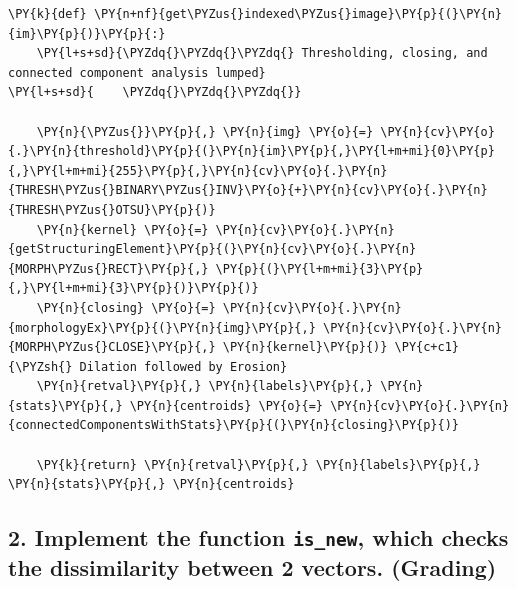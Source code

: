 \documentclass[a4paper,11pt]{article}%
\begin{document}
    \begin{tcolorbox}[breakable, size=fbox, boxrule=1pt, pad at break*=1mm,colback=cellbackground, colframe=cellborder]
\begin{Verbatim}[commandchars=\\\{\}]
\PY{k}{def} \PY{n+nf}{get\PYZus{}indexed\PYZus{}image}\PY{p}{(}\PY{n}{im}\PY{p}{)}\PY{p}{:}
    \PY{l+s+sd}{\PYZdq{}\PYZdq{}\PYZdq{} Thresholding, closing, and connected component analysis lumped}
\PY{l+s+sd}{    \PYZdq{}\PYZdq{}\PYZdq{}}

    \PY{n}{\PYZus{}}\PY{p}{,} \PY{n}{img} \PY{o}{=} \PY{n}{cv}\PY{o}{.}\PY{n}{threshold}\PY{p}{(}\PY{n}{im}\PY{p}{,}\PY{l+m+mi}{0}\PY{p}{,}\PY{l+m+mi}{255}\PY{p}{,}\PY{n}{cv}\PY{o}{.}\PY{n}{THRESH\PYZus{}BINARY\PYZus{}INV}\PY{o}{+}\PY{n}{cv}\PY{o}{.}\PY{n}{THRESH\PYZus{}OTSU}\PY{p}{)}
    \PY{n}{kernel} \PY{o}{=} \PY{n}{cv}\PY{o}{.}\PY{n}{getStructuringElement}\PY{p}{(}\PY{n}{cv}\PY{o}{.}\PY{n}{MORPH\PYZus{}RECT}\PY{p}{,} \PY{p}{(}\PY{l+m+mi}{3}\PY{p}{,}\PY{l+m+mi}{3}\PY{p}{)}\PY{p}{)}
    \PY{n}{closing} \PY{o}{=} \PY{n}{cv}\PY{o}{.}\PY{n}{morphologyEx}\PY{p}{(}\PY{n}{img}\PY{p}{,} \PY{n}{cv}\PY{o}{.}\PY{n}{MORPH\PYZus{}CLOSE}\PY{p}{,} \PY{n}{kernel}\PY{p}{)} \PY{c+c1}{\PYZsh{} Dilation followed by Erosion}
    \PY{n}{retval}\PY{p}{,} \PY{n}{labels}\PY{p}{,} \PY{n}{stats}\PY{p}{,} \PY{n}{centroids} \PY{o}{=} \PY{n}{cv}\PY{o}{.}\PY{n}{connectedComponentsWithStats}\PY{p}{(}\PY{n}{closing}\PY{p}{)}

    \PY{k}{return} \PY{n}{retval}\PY{p}{,} \PY{n}{labels}\PY{p}{,} \PY{n}{stats}\PY{p}{,} \PY{n}{centroids}
\end{Verbatim}
\end{tcolorbox}

    \hypertarget{implement-the-function-is_new-which-checks-the-dissimilarity-between-2-vectors.-grading}{%
\subsection{\texorpdfstring{2. Implement the function
\texttt{is\_new}, which checks the dissimilarity between 2 vectors.
(Grading)}{2. Implement the function is\_new, which checks the dissimilarity between 2 vectors. (Grading)}}\label{implement-the-function-is_new-which-checks-the-dissimilarity-between-2-vectors.-grading}}
\end{document}
